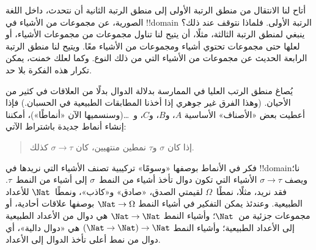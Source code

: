 \documentclass[../../../include/open-logic-section]{subfiles}
\begin{document}


أتاح لنا الانتقال من منطق الرتبة الأولى إلى منطق الرتبة الثانية أن
نتحدث، داخل اللغة الصورية، عن مجموعات من الأشياء في !!{domain} الرتبة
الأولى. فلماذا نتوقف عند ذلك؟ ينبغي لمنطق الرتبة الثالثة، مثلًا، أن
يتيح لنا تناول مجموعات من مجموعات الأشياء، أو لعلها حتى مجموعات تحتوي
أشياء ومجموعات من الأشياء معًا. ويتيح لنا منطق الرتبة الرابعة الحديث
عن مجموعات من الأشياء التي من ذلك النوع. وكما لعلك خمنت، يمكن تكرار
هذه الفكرة بلا حد.

يُصاغ منطق الرتب العليا في الممارسة بدلالة الدوال بدلًا من العلاقات
في كثير من الأحيان. (وهذا الفرق غير جوهري إذا أخذنا المطابقات الطبيعية
في الحسبان.) فإذا أعطيت بعض «الأصناف» الأساسية $A$، و$B$، و$C$،
و~\dots (وسنسميها الآن «أنماطًا»)، أمكننا إنشاء أنماط جديدة باشتراط
الآتي:
\begin{quote}
إذا كان $\sigma$ و$\tau$ نمطين منتهيين، كان $\sigma \to \tau$ كذلك.
\end{quote}
فكر في الأنماط بوصفها «وسومًا» تركيبية تصنف الأشياء التي نريدها في
!!{domain}نا؛ ويصف $\sigma \to \tau$ الأشياء التي تكون دوال تأخذ
أشياء من النمط~$\sigma$ إلى أشياء من النمط~$\tau$. فقد نريد، مثلًا،
نمطًا~$\Omega$ لقيمتي الصدق، «صادق» و«كاذب»، ونمطًا~$\Nat$ للأعداد
الطبيعية. وعندئذ يمكن التفكير في أشياء النمط $\Nat \to \Omega$ بوصفها
علاقات أحادية، أو مجموعات جزئية من~$\Nat$؛ وأشياء النمط $\Nat \to
\Nat$ هي دوال من الأعداد الطبيعية إلى الأعداد الطبيعية؛ وأشياء النمط
$(\Nat \to \Nat) \to \Nat$ هي «دوال دالية»، أي دوال من نمط أعلى تأخذ
الدوال إلى الأعداد.
\end{document}
